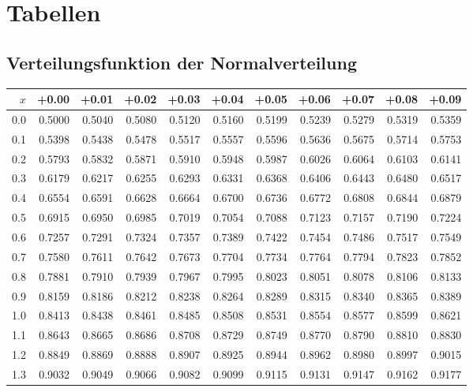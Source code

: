 
\section{Tabellen}

\subsection{Verteilungsfunktion der Normalverteilung}
\label{Verteilungsfunktion der Normalverteilung}


\begin{center}
    \small
    \begin{tabular}{|r|rrrrrrrrrr|}
        \hline
        $x$&+0.00&+0.01&+0.02&+0.03&+0.04&+0.05&+0.06&+0.07&+0.08&+0.09\\
        \hline
        0.0&0.5000&0.5040&0.5080&0.5120&0.5160&0.5199&0.5239&0.5279&0.5319&0.5359\\
        0.1&0.5398&0.5438&0.5478&0.5517&0.5557&0.5596&0.5636&0.5675&0.5714&0.5753\\
        0.2&0.5793&0.5832&0.5871&0.5910&0.5948&0.5987&0.6026&0.6064&0.6103&0.6141\\
        0.3&0.6179&0.6217&0.6255&0.6293&0.6331&0.6368&0.6406&0.6443&0.6480&0.6517\\
        0.4&0.6554&0.6591&0.6628&0.6664&0.6700&0.6736&0.6772&0.6808&0.6844&0.6879\\
        0.5&0.6915&0.6950&0.6985&0.7019&0.7054&0.7088&0.7123&0.7157&0.7190&0.7224\\
        0.6&0.7257&0.7291&0.7324&0.7357&0.7389&0.7422&0.7454&0.7486&0.7517&0.7549\\
        0.7&0.7580&0.7611&0.7642&0.7673&0.7704&0.7734&0.7764&0.7794&0.7823&0.7852\\
        0.8&0.7881&0.7910&0.7939&0.7967&0.7995&0.8023&0.8051&0.8078&0.8106&0.8133\\
        0.9&0.8159&0.8186&0.8212&0.8238&0.8264&0.8289&0.8315&0.8340&0.8365&0.8389\\
        1.0&0.8413&0.8438&0.8461&0.8485&0.8508&0.8531&0.8554&0.8577&0.8599&0.8621\\
        1.1&0.8643&0.8665&0.8686&0.8708&0.8729&0.8749&0.8770&0.8790&0.8810&0.8830\\
        1.2&0.8849&0.8869&0.8888&0.8907&0.8925&0.8944&0.8962&0.8980&0.8997&0.9015\\
        1.3&0.9032&0.9049&0.9066&0.9082&0.9099&0.9115&0.9131&0.9147&0.9162&0.9177\\

\end{tabular}
\end{center}
